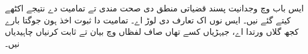 \documentclass[../../../include/open-logic-chapter]{subfiles}
\begin{document}

\begin{editorial}
  ایس باب وچ وجدانیت پسند قضیاتی منطق دی صحت مندی تے تمامیت دے نتیجے
  اکٹھے کیتے گئے نیں۔ ایس نوں اک تعارف دی لوڑ اے۔ تمامیت دا ثبوت اخذ ہون
  جوگتا بارے کجھ گلاں ورتدا اے، جیہڑیاں کسے تھاں صاف لفظاں وچ بیان تے
  ثابت کرنیاں چاہیدیاں نیں۔
\end{editorial}


\OLEndChapterHook
\end{document}

